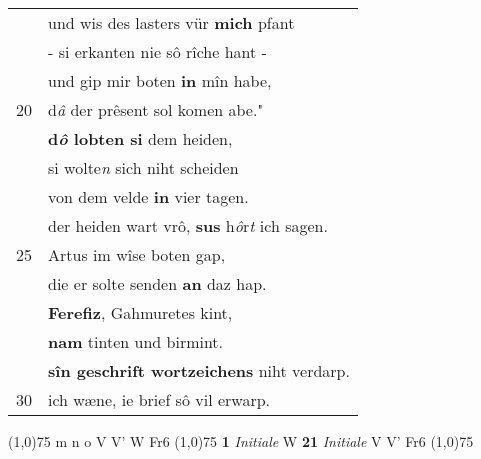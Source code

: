 \documentclass[8pt,a4paper,notitlepage]{article}
\begin{document}
\begin{table}[ht]
\begin{minipage}[t]{0.5\linewidth}
\begin{tabular}{rl}
 & und wis des lasters vür \textbf{mich} pfant\\ 
 & - si erkanten nie sô rîche hant -\\ 
 & und gip mir boten \textbf{in} mîn habe,\\ 
20 & d\textit{â} der prêsent sol komen abe."\\ 
 & \textbf{d\textit{ô} lobten si} dem heiden,\\ 
 & si wolte\textit{n} sich niht scheiden\\ 
 & von dem velde \textbf{in} vier tagen.\\ 
 & der heiden wart vrô, \textbf{sus} h\textit{ô}r\textit{t} ich sagen.\\ 
25 & Artus im wîse boten gap,\\ 
 & die er solte senden \textbf{an} daz hap.\\ 
 & \textbf{Ferefiz}, Gahmuretes kint,\\ 
 & \textbf{nam} tinten und birmint.\\ 
 & \textbf{sîn geschrift wortzeichens} niht verdarp.\\ 
30 & ich wæne, ie brief sô vil erwarp.\\ 
\end{tabular}
\scriptsize
\line(1,0){75} \newline
m n o V V' W Fr6 \newline
\line(1,0){75} \newline
\textbf{1} \textit{Initiale} W  \textbf{21} \textit{Initiale} V V' Fr6  \newline
\line(1,0){75} \newline

\end{minipage}
\end{table}
\end{document}
